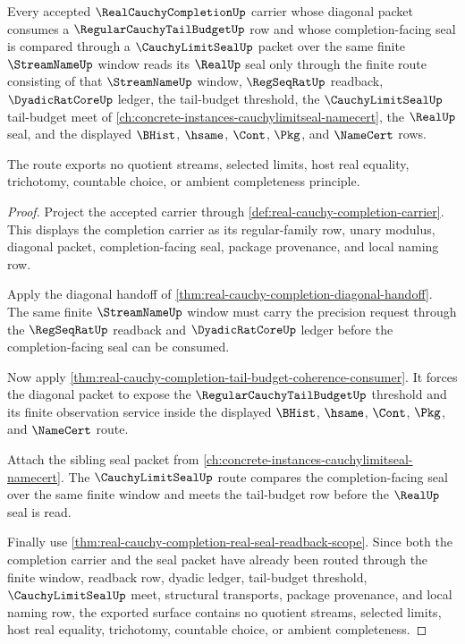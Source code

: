 \begin{theorem}
\label{thm:real-cauchy-completion-tail-budget-seal-route}
Every accepted $\RealCauchyCompletionUp$ carrier whose diagonal packet consumes a $\RegularCauchyTailBudgetUp$ row and whose completion-facing seal is compared through a $\CauchyLimitSealUp$ packet over the same finite $\StreamNameUp$ window reads its $\RealUp$ seal only through the finite route consisting of that $\StreamNameUp$ window, $\RegSeqRatUp$ readback, $\DyadicRatCoreUp$ ledger, the tail-budget threshold, the $\CauchyLimitSealUp$ tail-budget meet of \autoref{ch:concrete-instances-cauchylimitseal-namecert}, the $\RealUp$ seal, and the displayed $\BHist$, $\hsame$, $\Cont$, $\Pkg$, and $\NameCert$ rows.

The route exports no quotient streams, selected limits, host real equality, trichotomy, countable choice, or ambient completeness principle.
\end{theorem}
\begin{proof}
Project the accepted carrier through \autoref{def:real-cauchy-completion-carrier}. This displays the completion carrier as its regular-family row, unary modulus, diagonal packet, completion-facing seal, package provenance, and local naming row.

Apply the diagonal handoff of \autoref{thm:real-cauchy-completion-diagonal-handoff}. The same finite $\StreamNameUp$ window must carry the precision request through the $\RegSeqRatUp$ readback and $\DyadicRatCoreUp$ ledger before the completion-facing seal can be consumed.

Now apply \autoref{thm:real-cauchy-completion-tail-budget-coherence-consumer}. It forces the diagonal packet to expose the $\RegularCauchyTailBudgetUp$ threshold and its finite observation service inside the displayed $\BHist$, $\hsame$, $\Cont$, $\Pkg$, and $\NameCert$ route.

Attach the sibling seal packet from \autoref{ch:concrete-instances-cauchylimitseal-namecert}. The $\CauchyLimitSealUp$ route compares the completion-facing seal over the same finite window and meets the tail-budget row before the $\RealUp$ seal is read.

Finally use \autoref{thm:real-cauchy-completion-real-seal-readback-scope}. Since both the completion carrier and the seal packet have already been routed through the finite window, readback row, dyadic ledger, tail-budget threshold, $\CauchyLimitSealUp$ meet, structural transports, package provenance, and local naming row, the exported surface contains no quotient streams, selected limits, host real equality, trichotomy, countable choice, or ambient completeness.
\end{proof}

